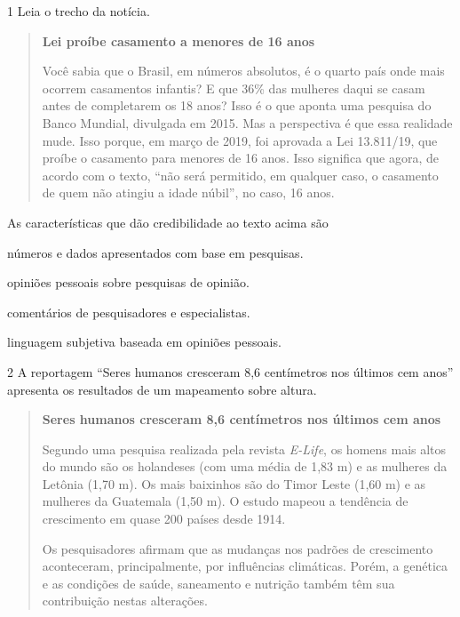 
\num{1} Leia o trecho da notícia.

\begin{quote}
\textbf{Lei proíbe casamento a menores de 16 anos}

Você sabia que o Brasil, em números absolutos, é o quarto país onde mais
ocorrem casamentos infantis? E que 36\% das mulheres daqui se casam
antes de completarem os 18 anos? Isso é o que aponta uma pesquisa do
Banco Mundial, divulgada em 2015. Mas a perspectiva é que essa realidade
mude. Isso porque, em março de 2019, foi aprovada a Lei 13.811/19, que
proíbe o casamento para menores de 16 anos. Isso significa que agora, de
acordo com o texto, ``não será permitido, em qualquer caso, o casamento
de quem não atingiu a idade núbil'', no caso, 16 anos.

\end{quote}

As características que dão credibilidade ao texto acima são

\begin{escolha}
\item números e dados apresentados com base em pesquisas.

\item opiniões pessoais sobre pesquisas de opinião.

\item comentários de pesquisadores e especialistas.

\item linguagem subjetiva baseada em opiniões pessoais.
\end{escolha}



\num{2} A reportagem ``Seres humanos cresceram 8,6 centímetros nos últimos cem
anos'' apresenta os resultados de um mapeamento sobre altura.

\begin{quote}
\textbf{Seres humanos cresceram 8,6 centímetros nos últimos cem anos}

Segundo uma pesquisa realizada pela revista \textit{E-Life}, os homens
mais altos do mundo são os holandeses (com uma média de 1,83 m) e as
mulheres da Letônia (1,70 m). Os mais baixinhos são do Timor Leste (1,60 m)
e as mulheres da Guatemala (1,50 m). O estudo mapeou a tendência de
crescimento em quase 200 países desde 1914.

Os pesquisadores afirmam que as mudanças nos padrões de crescimento
aconteceram, principalmente, por influências climáticas. Porém, a 
genética e as condições de saúde, saneamento e nutrição também têm sua
contribuição nestas alterações.

\end{quote}

